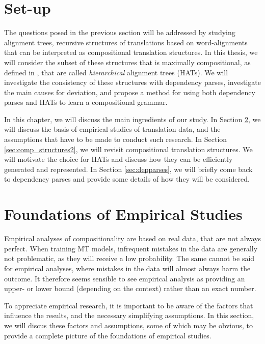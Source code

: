\section{Set-up}
\label{sec:setup}

The questions posed in the previous section will be addressed by studying alignment trees, recursive structures of translations based on word-alignments that can be interpreted as compositional translation structures. In this thesis, we will consider the subset of these structures that is maximally compositional, as defined in \cite{simaan2013hats}, that are called \textit{hierarchical} alignment trees (HATs). We will investigate the consistency of these structures with dependency parses, investigate the main causes for deviation, and propose a method for using both dependency parses and HATs to learn a compositional grammar.

In this chapter, we will discuss the main ingredients of our study. In Section \ref{sec:assumptions}, we will discuss the basis of empirical studies of translation data, and the assumptions that have to be made to conduct such research. In Section \ref{sec:comp_structures2}, we will revisit compositional translation structures. We will motivate the choice for HATs and discuss how they can be efficiently generated and represented. In Section \ref{sec:depparses}, we will briefly come back to dependency parses and provide some details of how they will be considered.


\section{Foundations of Empirical Studies}
\label{sec:assumptions}

Empirical analyses of compositionality are based on real data, that are not always perfect. When training MT models, infrequent mistakes in the data are generally not problematic, as they will receive a low probability. The same cannot be said for empirical analyses, where mistakes in the data will almost always harm the outcome. It therefore seems sensible to see empirical analysis as providing an upper- or lower bound (depending on the context) rather than an exact number. 

To appreciate empirical research, it is important to be aware of the factors that influence the results, and the necessary simplifying assumptions. In this section, we will discus these factors and assumptions, some of which may be obvious, to provide a complete picture of the foundations of empirical studies.

